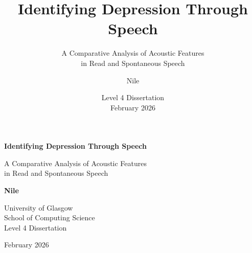 \documentclass[aspectratio=169,11pt]{beamer}
\title[Depression \& Speech]{\Large Identifying Depression Through Speech}
\subtitle{A Comparative Analysis of Acoustic Features\\in Read and Spontaneous Speech}
\author{Nile}
\institute{University of Glasgow\\School of Computing Science}
\date{Level 4 Dissertation \\ February 2026}
\begin{document}
\begin{frame}[plain]
    \vfill
    \centering
    
    {\LARGE\bfseries\color{uofgblue} Identifying Depression Through Speech}
    
    \vspace{0.5cm}
    
    {\large\color{darkgrey} A Comparative Analysis of Acoustic Features\\in Read and Spontaneous Speech}
    
    \vspace{1cm}
    
    \textbf{Nile}
    
    \vspace{0.3cm}
    
    {\small University of Glasgow\\School of Computing Science\\Level 4 Dissertation}
    
    \vspace{0.8cm}
    
    {\footnotesize February 2026}
    
    \vfill
\end{frame}
\end{document}
